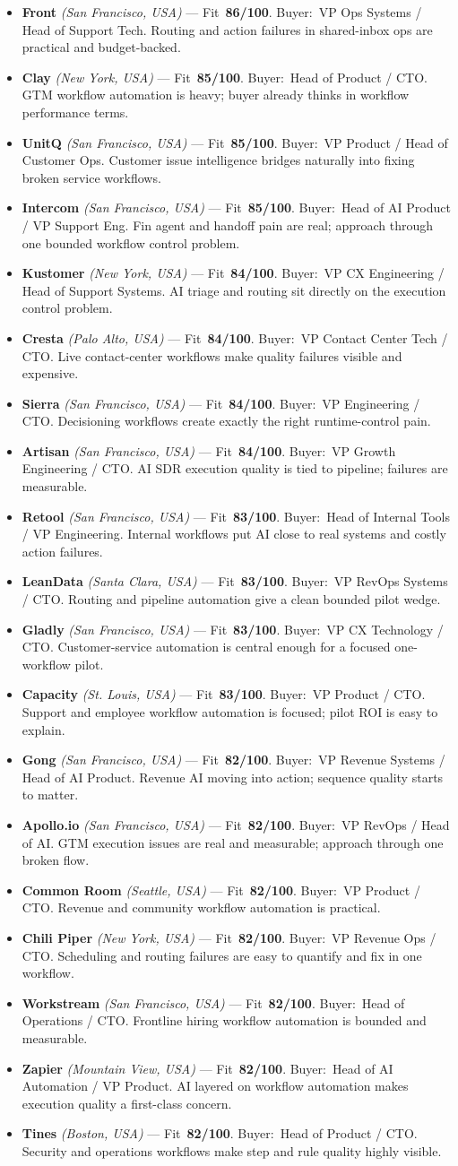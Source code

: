 \documentclass[10pt]{article}
\newcommand{\cand}[5]{\item \textbf{#1} \textit{(#2)} --- Fit~\textbf{#3/100}. Buyer:~#4. #5}
\begin{document}
\begin{itemize}
\cand{Front}{San Francisco, USA}{86}{VP Ops Systems / Head of Support Tech}{Routing and action failures in shared-inbox ops are practical and budget-backed.}
\cand{Clay}{New York, USA}{85}{Head of Product / CTO}{GTM workflow automation is heavy; buyer already thinks in workflow performance terms.}
\cand{UnitQ}{San Francisco, USA}{85}{VP Product / Head of Customer Ops}{Customer issue intelligence bridges naturally into fixing broken service workflows.}
\cand{Intercom}{San Francisco, USA}{85}{Head of AI Product / VP Support Eng}{Fin agent and handoff pain are real; approach through one bounded workflow control problem.}
\cand{Kustomer}{New York, USA}{84}{VP CX Engineering / Head of Support Systems}{AI triage and routing sit directly on the execution control problem.}
\cand{Cresta}{Palo Alto, USA}{84}{VP Contact Center Tech / CTO}{Live contact-center workflows make quality failures visible and expensive.}
\cand{Sierra}{San Francisco, USA}{84}{VP Engineering / CTO}{Decisioning workflows create exactly the right runtime-control pain.}
\cand{Artisan}{San Francisco, USA}{84}{VP Growth Engineering / CTO}{AI SDR execution quality is tied to pipeline; failures are measurable.}
\cand{Retool}{San Francisco, USA}{83}{Head of Internal Tools / VP Engineering}{Internal workflows put AI close to real systems and costly action failures.}
\cand{LeanData}{Santa Clara, USA}{83}{VP RevOps Systems / CTO}{Routing and pipeline automation give a clean bounded pilot wedge.}
\cand{Gladly}{San Francisco, USA}{83}{VP CX Technology / CTO}{Customer-service automation is central enough for a focused one-workflow pilot.}
\cand{Capacity}{St. Louis, USA}{83}{VP Product / CTO}{Support and employee workflow automation is focused; pilot ROI is easy to explain.}
\cand{Gong}{San Francisco, USA}{82}{VP Revenue Systems / Head of AI Product}{Revenue AI moving into action; sequence quality starts to matter.}
\cand{Apollo.io}{San Francisco, USA}{82}{VP RevOps / Head of AI}{GTM execution issues are real and measurable; approach through one broken flow.}
\cand{Common Room}{Seattle, USA}{82}{VP Product / CTO}{Revenue and community workflow automation is practical.}
\cand{Chili Piper}{New York, USA}{82}{VP Revenue Ops / CTO}{Scheduling and routing failures are easy to quantify and fix in one workflow.}
\cand{Workstream}{San Francisco, USA}{82}{Head of Operations / CTO}{Frontline hiring workflow automation is bounded and measurable.}
\cand{Zapier}{Mountain View, USA}{82}{Head of AI Automation / VP Product}{AI layered on workflow automation makes execution quality a first-class concern.}
\cand{Tines}{Boston, USA}{82}{Head of Product / CTO}{Security and operations workflows make step and rule quality highly visible.}

\end{itemize}
\end{document}
